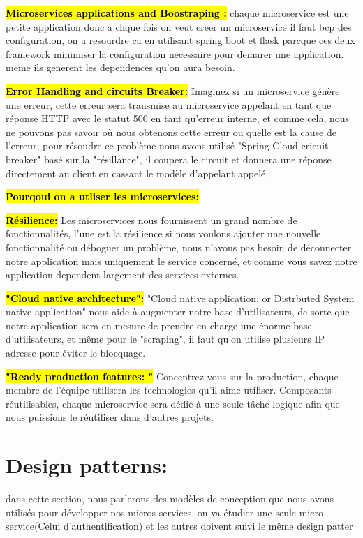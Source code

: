 \hl{\textbf{Microservices applications and Boostraping :}}
chaque microservice est une petite application donc a chque fois on veut creer un microservice il faut bcp des configuration, on a resourdre ca en utilisant spring boot et flask parcque ces deux framework minimiser la configuration necessaire pour demarer une application. meme ils generent les dependences qu'on aura besoin.

\hl{\textbf{Error Handling and circuits Breaker:}}
Imaginez si un microservice génère une erreur, cette erreur sera transmise au microservice appelant en tant que réponse HTTP avec le statut 500 en tant qu'erreur interne, et comme cela, nous ne pouvons pas savoir où nous obtenons cette erreur ou quelle est la cause de l'erreur, pour résoudre ce problème nous avons utilisé "Spring Cloud cricuit breaker" basé sur la "résillance", il coupera le circuit et donnera une réponse directement au client en cassant le modèle d'appelant appelé.



\hl{\textbf{Pourqoui on a utliser les microservices:}}


\hl{\textbf{Résilience:}}
Les microservices nous fournissent un grand nombre de fonctionnalités, l'une est la résilience si nous voulons ajouter une nouvelle fonctionnalité ou déboguer un problème, nous n'avons pas besoin de déconnecter notre application mais uniquement le service concerné, et comme vous savez notre application dependent largement des services externes.

\hl{\textbf{"Cloud native architecture":}}
"Cloud native application, or Distrbuted System native application" nous aide à augmenter notre base d'utilisateurs, de sorte que notre application sera en mesure de prendre en charge une énorme base d'utilisateurs, et même pour le "scraping", il faut qu'on utilise plusieurs IP adresse pour éviter le blocquage.

\hl{\textbf{"Ready production features: "}}
Concentrez-vous sur la production, chaque membre de l'équipe utilisera les technologies qu'il aime utiliser.
Composants réutilisables, chaque microservice sera dédié à une seule tâche logique afin que nous puissions le réutiliser dans d'autres projets.



\section{Design patterns: }
dans cette section, nous parlerons des modèles de conception que nous avons utilisés pour développer nos micros services, on va étudier une seule micro service(Celui d'authentification) et les autres doivent suivi le même design patter


